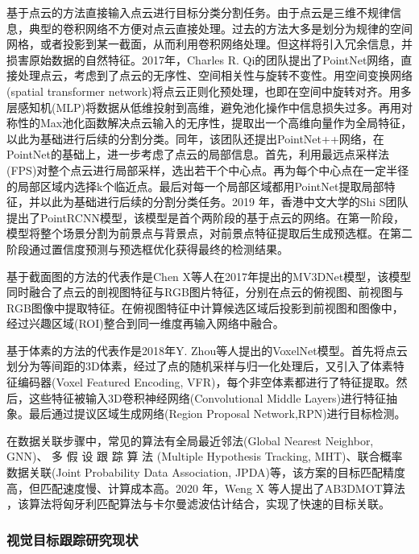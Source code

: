 基于点云的方法直接输入点云进行目标分类分割任务。由于点云是三维不规律信息，典型的卷积网络不方便对点云直接处理。过去的方法大多是划分为规律的空间网格，或者投影到某一截面，从而利用卷积网络处理。但这样将引入冗余信息，并损害原始数据的自然特征。2017年，Charles R. Qi的团队提出了PointNet网络\cite{qi2017pointnet}，直接处理点云，考虑到了点云的无序性、空间相关性与旋转不变性。用空间变换网络(spatial transformer network)将点云正则化预处理，也即在空间中旋转对齐。用多层感知机(MLP)将数据从低维投射到高维，避免池化操作中信息损失过多。再用对称性的Max池化函数解决点云输入的无序性，提取出一个高维向量作为全局特征，以此为基础进行后续的分割分类。同年，该团队还提出PointNet++网络\cite{qi2017pointnet++}，在PointNet的基础上，进一步考虑了点云的局部信息。首先，利用最远点采样法(FPS)对整个点云进行局部采样，选出若干个中心点。再为每个中心点在一定半径的局部区域内选择k个临近点。最后对每一个局部区域都用PointNet提取局部特征，并以此为基础进行后续的分割分类任务。2019 年，香港中文大学的Shi S团队提出了PointRCNN模型\cite{shi2019pointrcnn}，该模型是首个两阶段的基于点云的网络。在第一阶段，模型将整个场景分割为前景点与背景点，对前景点特征提取后生成预选框。在第二阶段通过置信度预测与预选框优化获得最终的检测结果。

基于截面图的方法的代表作是Chen X等人在2017年提出的MV3DNet模型\cite{chen2017multi}，该模型同时融合了点云的剖视图特征与RGB图片特征，分别在点云的俯视图、前视图与RGB图像中提取特征。在俯视图特征中计算候选区域后投影到前视图和图像中，经过兴趣区域(ROI)整合到同一维度再输入网络中融合。

基于体素的方法的代表作是2018年Y. Zhou等人提出的VoxelNet模型\cite{zhou2018voxelnet}。首先将点云划分为等间距的3D体素，经过了点的随机采样与归一化处理后，又引入了体素特征编码器(Voxel Featured Encoding, VFR)，每个非空体素都进行了特征提取。然后，这些特征被输入3D卷积神经网络(Convolutional Middle Layers)进行特征抽象。最后通过提议区域生成网络(Region Proposal Network,RPN)进行目标检测。

在数据关联步骤中，常见的算法有全局最近邻法(Global Nearest Neighbor, GNN)、 多 假 设 跟 踪 算 法 (Multiple Hypothesis Tracking, MHT)、联合概率数据关联(Joint Probability Data Association, JPDA)等，该方案的目标匹配精度高，但匹配速度慢、计算成本高。2020 年，Weng X 等人提出了AB3DMOT算法\cite{weng2020ab3dmot} \cite{weng20203d}，该算法将匈牙利匹配算法与卡尔曼滤波估计结合，实现了快速的目标关联。

\subsubsection{视觉目标跟踪研究现状}

